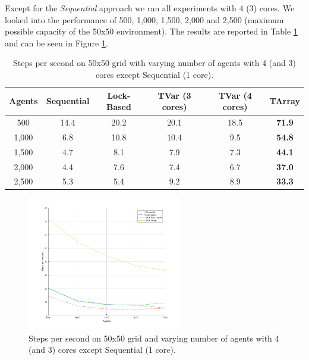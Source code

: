 Except for the \textit{Sequential} approach we ran all experiments with 4 (3) cores. We looked into the performance of 500, 1,000, 1,500, 2,000 and 2,500 (maximum possible capacity of the 50x50 environment). The results are reported in Table \ref{tab:state_results_agentsscale_time} and can be seen in Figure \ref{fig:state_results_agentsscale_time}.

\begin{table}
	\centering
  	\begin{tabular}{ c || c | c | c | c | c }
        Agents  & Sequential & Lock-Based & TVar (3 cores) & TVar (4 cores) & TArray  \\ \hline \hline 
    	500     & 14.4       & 20.2		  &	20.1           & 18.5       	& \textbf{71.9}    \\ \hline
   		1,000   & 6.8        & 10.8 	  & 10.4           & 9.5       	    & \textbf{54.8}    \\ \hline
   		1,500   & 4.7        & 8.1 		  & 7.9            & 7.3			& \textbf{44.1}    \\ \hline
   		2,000   & 4.4        & 7.6 		  & 7.4            & 6.7    		& \textbf{37.0}    \\ \hline 
   		2,500   & 5.3        & 5.4 		  & 9.2            & 8.9			& \textbf{33.3}    \\ \hline \hline
   	\end{tabular}
  	
  	\caption{Steps per second on 50x50 grid with varying number of agents with 4 (and 3) cores except Sequential (1 core).}
	\label{tab:state_results_agentsscale_time}
\end{table}

\begin{figure}
	\centering
	\includegraphics[width=0.6\textwidth, angle=0]{./fig/sugarscape/varying_agents.png}
	\caption{Steps per second on 50x50 grid and varying number of agents with 4 (and 3) cores except Sequential (1 core).}
	\label{fig:state_results_agentsscale_time}
\end{figure}

